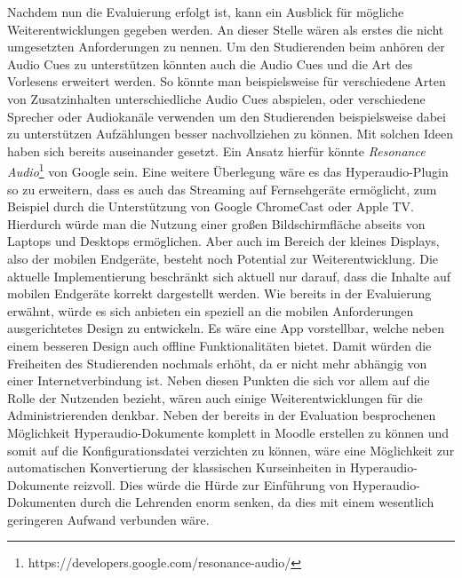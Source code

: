 Nachdem nun die Evaluierung erfolgt ist, kann ein Ausblick für mögliche Weiterentwicklungen gegeben werden. An dieser Stelle wären als erstes die nicht umgesetzten Anforderungen zu nennen. Um den Studierenden beim anhören der Audio Cues zu unterstützen könnten auch die Audio Cues und die Art des Vorlesens erweitert werden. So könnte man beispielsweise für verschiedene Arten von Zusatzinhalten unterschiedliche Audio Cues abspielen, oder verschiedene Sprecher oder Audiokanäle verwenden um den Studierenden beispielsweise dabei zu unterstützen Aufzählungen besser nachvollziehen zu können. Mit solchen Ideen haben sich bereits \cite{donker2007gestaltung} auseinander gesetzt. Ein Ansatz hierfür könnte \textit{Resonance Audio}\footnote{https://developers.google.com/resonance-audio/} von Google sein.
Eine weitere Überlegung wäre es das Hyperaudio-Plugin so zu erweitern, dass es auch das Streaming auf Fernsehgeräte ermöglicht, zum Beispiel durch die Unterstützung von Google ChromeCast oder Apple TV. Hierdurch würde man die Nutzung einer großen Bildschirmfläche abseits von Laptops und Desktops ermöglichen.
Aber auch im Bereich der kleines Displays, also der mobilen Endgeräte, besteht noch Potential zur Weiterentwicklung. Die aktuelle Implementierung beschränkt sich aktuell nur darauf, dass die Inhalte auf mobilen Endgeräte korrekt dargestellt werden. Wie bereits in der Evaluierung erwähnt, würde es sich anbieten ein speziell an die mobilen Anforderungen ausgerichtetes Design zu entwickeln. Es wäre eine App vorstellbar, welche neben einem besseren Design auch offline Funktionalitäten bietet. Damit würden die Freiheiten des Studierenden nochmals erhöht, da er nicht mehr abhängig von einer Internetverbindung ist.
Neben diesen Punkten die sich vor allem auf die Rolle der Nutzenden bezieht, wären auch einige Weiterentwicklungen für die Administrierenden denkbar. Neben der bereits in der Evaluation besprochenen Möglichkeit Hyperaudio-Dokumente komplett in Moodle erstellen zu können und somit auf die Konfigurationsdatei verzichten zu können, wäre eine Möglichkeit zur automatischen Konvertierung der klassischen Kurseinheiten in Hyperaudio-Dokumente reizvoll. Dies würde die Hürde zur Einführung von Hyperaudio-Dokumenten durch die Lehrenden enorm senken, da dies mit einem wesentlich geringeren Aufwand verbunden wäre.


